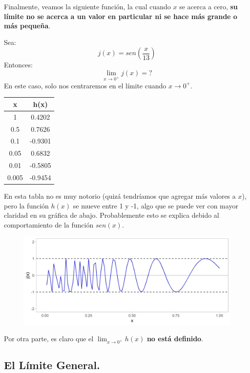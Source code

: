 \documentclass[12pt]{article}
\begin{document}
Finalmente, veamos la siguiente función, la cual cuando $x$ se acerca a cero, \textbf{su límite no se acerca a un valor en particular ni se hace más grande o más pequeña}.

Sea:
\[j(x) = sen (\frac{x}{13})\]
Entonces:
\[\lim_{x \to 0^{+}} j(x) = ?\]
En este caso, solo nos centraremos en el límite cuando $x \to 0^{+}$.

\begin{center}

\begin{tabular}{c | c}

x & h(x)\\
\hline
1 & 0.4202\\
0.5 & 0.7626\\
0.1 & -0.9301\\
0.05 & 0.6832\\
0.01 & -0.5805\\
0.005 & -0.9454\\

\end{tabular}

\end{center}

En esta tabla no es muy notorio (quizá tendríamos que agregar más valores a $x$), pero la función $h(x)$ se mueve entre 1 y -1, algo que se puede ver con mayor claridad en su gráfica de abajo. Probablemente esto se explica debido al comportamiento de la función $sen(x)$.

\begin{figure}[hbt!]
\centering
\includegraphics[scale=0.7]{img/limit_plot_j.jpg}
\end{figure}

Por otra parte, es claro que el $\lim_{x \to 0^{+}} h(x)$ \textbf{no está definido}.


\subsection{El Límite General.}
\end{document}
